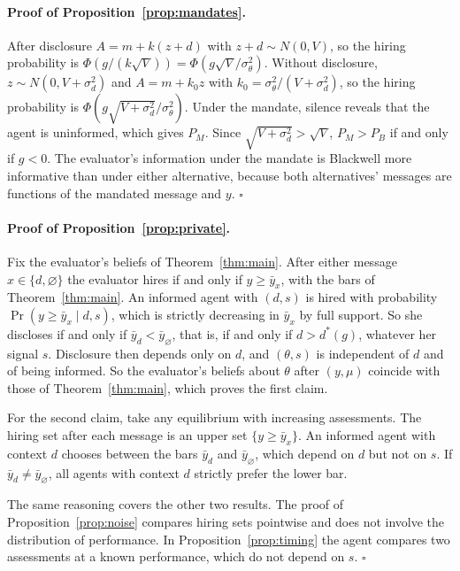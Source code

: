 \documentclass[11pt]{article}
\theoremstyle{definition}
\newcommand{\sil}{\varnothing}
\newcommand{\sd}{\sigma_d}
\newcommand{\sth}{\sigma_\theta}
\begin{document}
\paragraph{Proof of Proposition~\ref{prop:mandates}.} After disclosure $A=m+k(z+d)$ with $z+d\sim N(0,V)$, so the hiring probability is $\Phi(g/(k\sqrt V))=\Phi(g\sqrt V/\sth^2)$. Without disclosure, $z\sim N(0,V+\sd^2)$ and $A=m+k_0z$ with $k_0=\sth^2/(V+\sd^2)$, so the hiring probability is $\Phi(g\sqrt{V+\sd^2}/\sth^2)$. Under the mandate, silence reveals that the agent is uninformed, which gives $P_M$. Since $\sqrt{V+\sd^2}>\sqrt V$, $P_M>P_B$ if and only if $g<0$. The evaluator's information under the mandate is Blackwell more informative than under either alternative, because both alternatives' messages are functions of the mandated message and $y$. \hfill$\square$

\paragraph{Proof of Proposition~\ref{prop:private}.} Fix the evaluator's beliefs of Theorem~\ref{thm:main}. After either message $x\in\{d,\sil\}$ the evaluator hires if and only if $y\ge\bar y_x$, with the bars of Theorem~\ref{thm:main}. An informed agent with $(d,s)$ is hired with probability $\Pr(y\ge\bar y_x\mid d,s)$, which is strictly decreasing in $\bar y_x$ by full support. So she discloses if and only if $\bar y_d<\bar y_\sil$, that is, if and only if $d>d^*(g)$, whatever her signal $s$. Disclosure then depends only on $d$, and $(\theta,s)$ is independent of $d$ and of being informed. So the evaluator's beliefs about $\theta$ after $(y,\mu)$ coincide with those of Theorem~\ref{thm:main}, which proves the first claim.

For the second claim, take any equilibrium with increasing assessments. The hiring set after each message is an upper set $\{y\ge\bar y_x\}$. An informed agent with context $d$ chooses between the bars $\bar y_d$ and $\bar y_\sil$, which depend on $d$ but not on $s$. If $\bar y_d\ne\bar y_\sil$, all agents with context $d$ strictly prefer the lower bar.

The same reasoning covers the other two results. The proof of Proposition~\ref{prop:noise} compares hiring sets pointwise and does not involve the distribution of performance. In Proposition~\ref{prop:timing} the agent compares two assessments at a known performance, which do not depend on $s$. \hfill$\square$


\end{document}
